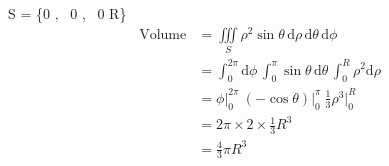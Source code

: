 S = \{0 \leqslant \phi {}\pi, \ 0 \leq \theta \leq \pi, \ 0 \leq \rho \leq R\}
\begin{align*}
\mathrm{Volume} &=\iiint\limits_S\! \rho^2 \sin\theta \,\mathrm{d}\rho \,\mathrm{d}\theta \,\mathrm{d}\phi \\
&=\int_0^{2 \pi }\! \mathrm{d}\phi \,\int_0^{ \pi }\! \sin\theta \,\mathrm{d}\theta \,\int_0^R\! \rho^2 \mathrm{d}\rho \\
&=\phi \Bigr|_0^{2\pi}\ (-\cos\theta) \Bigr|_0^{ \pi }\ \tfrac13 \rho^3 \Bigr|_0^R \\
&=2\pi \times 2 \times \tfrac13 R^3 \\
&=\tfrac43 \pi R^3
\end{align*}

